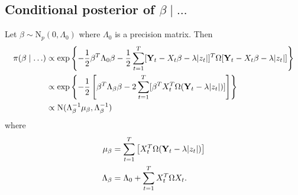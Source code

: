 \subsection*{Conditional posterior of $\beta \mid \ldots$}\label{s:betapost}
Let $\beta \sim \mbox{N}_{p}(0, \Lambda_0)$ where $\Lambda_0$ is a precision matrix. Then
\begin{align*}
    \pi(\beta \mid \ldots) & \propto \exp \left\{ - \frac{ 1 }{ 2 } \beta^T \Lambda_0 \beta - \frac{ 1 }{ 2 } \sum_{t = 1 }^T [\mbox{\bf Y}_t - X_t \beta - \lambda |z_t|]^T \Omega [\mbox{\bf Y}_t - X_t \beta - \lambda |z_t|] \right\}\\
     & \propto \exp \left\{ -\frac{ 1 }{ 2 } \left[ \beta^T \Lambda_\beta \beta  - 2 \sum_{ t = 1 }^T [ \beta^T X_t^T \Omega (\mbox{\bf Y}_t - \lambda |z_t| )] \right] \right\}\\
     & \propto \mbox{N} ( \Lambda_\beta^{-1} \mu_\beta , \Lambda_\beta^{-1})
\end{align*}
where
\begin{align*}
    \mu_\beta &= \sum_{t=1}^{T} \left[ X_t^T \Omega (\mbox{\bf Y}_t - \lambda |z_t|) \right]\\
    \Lambda_\beta &= \Lambda_0 + \sum_{ t = 1 }^{ T} X_t^T \Omega X_t.
\end{align*}
